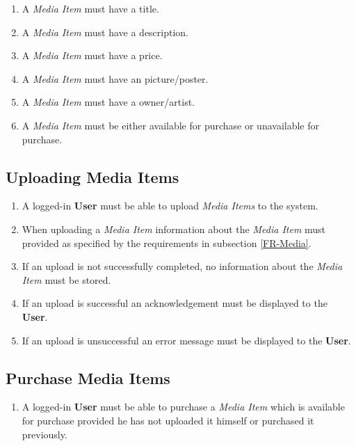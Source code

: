 \begin{enumerate}[label=FR-\twodigits*, resume]
	\item A \textit{Media Item} must have a title.
	\item A \textit{Media Item} must have a description.
	\item A \textit{Media Item} must have a price.
	\item A \textit{Media Item} must have an picture/poster.
	\item A \textit{Media Item} must have a owner/artist.
	\item A \textit{Media Item} must be either available for purchase or unavailable for purchase.
\end{enumerate}

\subsection {Uploading Media Items}

\begin{enumerate}[label=FR-\twodigits*, resume]
	\item A logged-in \textbf{User} must be able to upload \textit{Media Items} to the system.
	\item When uploading a \textit{Media Item} information about the \textit{Media Item} must provided as specified by the requirements in subsection \ref{FR-Media}.
	\item If an upload is not successfully completed, no information about the \textit{Media Item} must be stored.
	\item If an upload is successful an acknowledgement must be displayed to the \textbf{User}.
	\item If an upload is unsuccessful an error message must be displayed to the \textbf{User}. 
\end{enumerate}

\subsection {Purchase Media Items}

\begin{enumerate}[label=FR-\twodigits*, resume]
	\item A logged-in \textbf{User} must be able to purchase a \textit{Media Item} which is available for purchase provided he has not uploaded it himself or  purchased it previously.
\end{enumerate}

